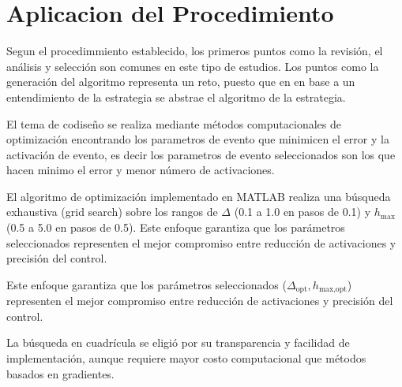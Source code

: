 \documentclass[conference]{IEEEtran}
\begin{document}
\section{Aplicacion del Procedimiento}
Segun el procedimmiento establecido, los primeros puntos como la revisi\'on, el an\'alisis y selecci\'on son comunes en este tipo de estudios. Los puntos como la generaci\'on del algoritmo representa un reto, puesto que en en base a un entendimiento de la estrategia se abstrae el algoritmo de la estrategia.

El tema de codiseño se realiza mediante m\'etodos computacionales de optimización encontrando los parametros de evento que minimicen el error y la activaci\'on de evento, es decir los parametros de evento seleccionados son los que hacen minimo el error y menor n\'umero de activaciones.

El algoritmo de optimización implementado en MATLAB realiza una búsqueda exhaustiva (grid search) sobre los rangos de $\Delta$ (0.1 a 1.0 en pasos de 0.1) y $h_{\text{max}}$ (0.5 a 5.0 en pasos de 0.5). Este enfoque garantiza que los parámetros seleccionados representen el mejor compromiso entre reducción de activaciones y precisión del control.

Este enfoque garantiza que los parámetros seleccionados ($\Delta_{\text{opt}}, h_{\text{max,opt}}$) representen el mejor compromiso entre reducción de activaciones y precisión del control.

La búsqueda en cuadrícula se eligió por su transparencia y facilidad de implementación, aunque requiere mayor costo computacional que métodos basados en gradientes.
\end{document}
